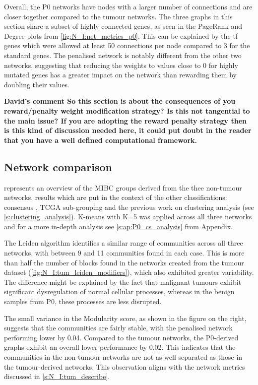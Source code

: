 Overall, the P0 networks have nodes with a larger number of connections and are closer together compared to the tumour networks. The three graphs in this section share a subset of highly connected genes, as seen in the PageRank and Degree plots from \cref{fig:N_I:net_metrics_p0}. This can be explained by the \acrfull{tf} genes which were allowed at least 50 connections per node compared to 3 for the standard genes. The penalised network is notably different from the other two networks, suggesting that reducing the weights to values close to 0 for highly mutated genes has a greater impact on the network than rewarding them by doubling their values.

\textbf{David's comment So this section is about the consequences of you reward/penalty weight modification strategy? Is this not tangential to the main issue? If you are adopting the reward penalty strategy then is this kind of discussion needed here, it could put doubt in the reader that you have a well defined computational framework.}

\subsection{Network comparison}

 represents an overview of the MIBC groups derived from the thee non-tumour networks, results which are put in the context of the other classifications: consensus \citep{Kamoun2020-tj}, TCGA sub-grouping \citep{Robertson2017-mg} and the previous work on clustering analysis (see \cref{s:clustering_analysis}). K-means with K=5 was applied across all three networks and for a more in-depth analysis see \cref{s:ap:P0_cs_analysis} from Appendix.

The Leiden algorithm identifies a similar range of communities across all three networks, with between 9 and 11 communities found in each case. This is more than half the number of blocks found in the networks created from the tumour dataset (\cref{fig:N_I:tum_leiden_modifiers}), which also exhibited greater variability. The difference might be explained by the fact that malignant tumours exhibit significant dysregulation of normal cellular processes, whereas in the benign samples from P0, these processes are less disrupted.

The small variance in the Modularity score, as shown in the figure on the right, suggests that the communities are fairly stable, with the penalised network performing lower by 0.04. Compared to the tumour networks, the P0-derived graphs exhibit an overall lower performance by 0.02. This indicates that the communities in the non-tumour networks are not as well separated as those in the tumour-derived networks. This observation aligns with the network metrics discussed in \cref{s:N_I:tum_describe}.

